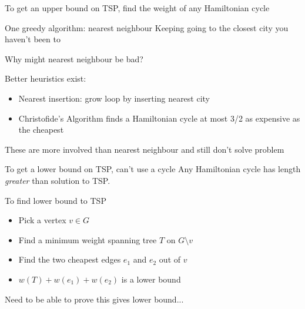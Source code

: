 \documentclass{beamer}
\begin{document}
\begin{frame}{To get an upper bound on TSP, find the weight of any Hamiltonian cycle}
  \begin{block}{One greedy algorithm: nearest neighbour}
    Keeping going to the closest city you haven't been to
  \end{block}
  \begin{block}{Why might nearest neighbour be bad?}
  \end{block}

  \begin{block}{Better heuristics exist:}
    \begin{itemize}
    \item Nearest insertion: grow loop by inserting nearest city
    \item Christofide's Algorithm finds a Hamiltonian cycle at most 3/2 as expensive as the cheapest
    \end{itemize}
    These are more involved than nearest neighbour and still don't solve problem
    \end{block}
  \end{frame}

\begin{frame}{To get a lower bound on TSP, can't use a cycle}
  Any Hamiltonian cycle has length \emph{greater} than solution to TSP.
  \begin{block}{To find lower bound to TSP}
    \begin{itemize}
    \item Pick a vertex $v\in G$
    \item Find a minimum weight spanning tree $T$ on $G\setminus v$
    \item Find the two cheapest edges $e_1$ and $e_2$ out of $v$
    \item $w(T)+w(e_1)+w(e_2)$ is a lower bound
    \end{itemize}
    \end{block}

  \begin{block}{Need to be able to prove this gives lower bound...}
  \end{block}
  
  \end{frame}
\end{document}
